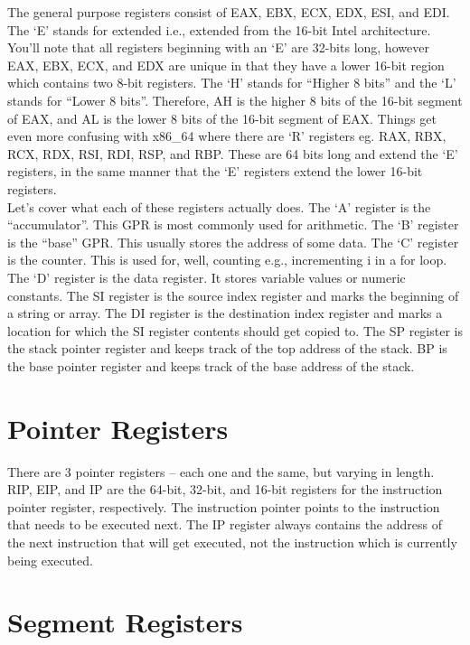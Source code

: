 \documentclass{article}
\begin{document}
   The general purpose registers consist of EAX, EBX, ECX, EDX, ESI, and EDI. The ‘E’ stands for extended i.e., extended 
   from the 16-bit Intel architecture. You’ll note that all registers beginning with an ‘E’ are 32-bits long, however EAX, EBX, 
   ECX, and EDX are unique in that they have a lower 16-bit region which contains two 8-bit registers. The ‘H’ 
   stands for “Higher 8 bits” and the ‘L’ stands for “Lower 8 bits”. Therefore, AH is the higher 8 bits 
   of the 16-bit segment of EAX, and AL is the lower 8 bits of the 16-bit segment of EAX. Things 
   get even more confusing with x86\_64 where there are ‘R’ registers eg. RAX, RBX, RCX, RDX, RSI, RDI, RSP, and 
   RBP. These are 64 bits long and extend the ‘E’ registers, in the same manner that the ‘E’ registers extend 
   the lower 16-bit registers.\\

   Let’s cover what each of these registers actually does. The ‘A’ register is the “accumulator”. This GPR is most commonly 
   used for arithmetic. The ‘B’ register is the “base” GPR. This usually stores the address of some data. The ‘C’ 
   register is the counter. This is used for, well, counting e.g., incrementing i in a for loop. The ‘D’ register 
   is the data register. It stores variable values or numeric constants. The SI register is the source index register and 
   marks the beginning of a string or array. The DI register is the destination index register and marks a location 
   for which the SI register contents should get copied to. The SP register is the stack pointer register and keeps 
   track of the top address of the stack. BP is the base pointer register and keeps track of the base address of the stack. 

\section{Pointer Registers}

	There are 3 pointer registers – each one and the same, but varying in length. RIP, EIP, and IP are 
   the 64-bit, 32-bit, and 16-bit registers for the instruction pointer register, respectively. The instruction pointer points to the instruction that 
   needs to be executed next. The IP register always contains the address of the next instruction that will get executed, 
   not the instruction which is currently being executed. 

\section{Segment Registers}
\end{document}
